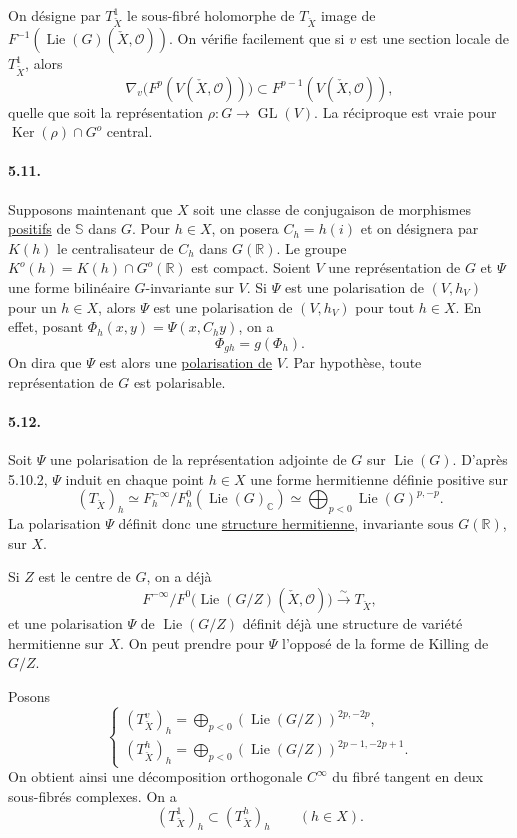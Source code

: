 \documentclass[10pt,leqno]{article}
\newcommand{\C}{\mathbb C}
\newcommand{\R}{\mathbb R}
\newcommand{\bS}{\mathbb S}
\newcommand{\cO}{\mathcal O}
\newcommand{\Ker}{\operatorname{Ker}}
\theoremstyle{deligne}
\newcommand{\Lie}{\operatorname{Lie}}
\newcommand{\GL}{\operatorname{GL}}
\renewcommand{\underline}[1]{\uline{#1}}
\begin{document}
On désigne par $T^1_{\check X}$ le sous-fibré holomorphe de $T_{\check X}$ image de $F^{-1}(\Lie(G)(\check X,\cO))$. On vérifie facilement que si $v$ est une section locale de $T^1_{\check X}$, alors
\[
  \nabla_v\bigl(F^p(V(\check X,\cO))\bigr)
  \subset F^{p-1}(V(\check X,\cO)),
\]
quelle que soit la représentation $\rho:G\to\GL(V)$. La réciproque est vraie pour $\Ker(\rho)\cap G^o$ central.

\paragraph{5.11.}
Supposons maintenant que $X$ soit une classe de conjugaison de morphismes \underline{positifs} de $\bS$ dans $G$. Pour $h\in X$, on posera $C_h=h(i)$ et on désignera par $K(h)$ le centralisateur de $C_h$ dans $G(\R)$. Le groupe $K^o(h)=K(h)\cap G^o(\R)$ est compact. Soient $V$ une représentation de $G$ et $\Psi$ une forme bilinéaire $G$-invariante sur $V$. Si $\Psi$ est une polarisation de $(V,h_V)$ pour un $h\in X$, alors $\Psi$ est une polarisation de $(V,h_V)$ pour tout $h\in X$. En effet, posant $\Phi_h(x,y)=\Psi(x,C_hy)$, on a
\[
\tag{5.11.1}
  \Phi_{gh}=g(\Phi_h).
\]
On dira que $\Psi$ est alors une \underline{polarisation de} $V$. Par hypothèse, toute représentation de $G$ est polarisable.

\paragraph{5.12.}
Soit $\Psi$ une polarisation de la représentation adjointe de $G$ sur $\Lie(G)$. D'après 5.10.2, $\Psi$ induit en chaque point $h\in X$ une forme hermitienne définie positive sur
\[
\tag{5.12.1}
  (T_{\check X})_h
  \simeq
  F_h^{-\infty}/F_h^0(\Lie(G)_\C)
  \simeq
  \bigoplus_{p<0}\Lie(G)^{p,-p}.
\]
La polarisation $\Psi$ définit donc une \underline{structure hermitienne}, invariante sous $G(\R)$, sur $X$.

Si $Z$ est le centre de $G$, on a déjà
\[
\tag{5.12.2}
  F^{-\infty}/F^0\bigl(\Lie(G/Z)(\check X,\cO)\bigr)
  \xrightarrow{\sim} T_{\check X},
\]
et une polarisation $\Psi$ de $\Lie(G/Z)$ définit déjà une structure de variété hermitienne sur $X$. On peut prendre pour $\Psi$ l'opposé de la forme de Killing de $G/Z$.

Posons
\[
\tag{5.12.3}
\begin{cases}
 (T_{\check X}^v)_h=\displaystyle\bigoplus_{p<0}(\Lie(G/Z))^{2p,-2p},\\[0.4em]
 (T_{\check X}^h)_h=\displaystyle\bigoplus_{p<0}(\Lie(G/Z))^{2p-1,-2p+1}.
\end{cases}
\]
On obtient ainsi une décomposition orthogonale $C^\infty$ du fibré tangent en deux sous-fibrés complexes. On a
\[
\tag{5.12.4}
  (T_{\check X}^1)_h\subset (T_{\check X}^h)_h \qquad (h\in X).
\]
\end{document}
